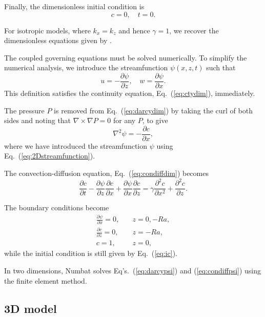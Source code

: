 \documentclass[11pt, a4paper]{csiroreport2012}
\begin{document}
Finally, the dimensionless initial condition is
\begin{equation}
c = 0, \quad t = 0.
\label{eq:ic}
\end{equation}

For isotropic models, where $k_x = k_z$ and hence $\gamma = 1$, we recover the dimensionless equations given by \cite{Slim2014}.

The coupled governing equations must be solved numerically. To simplify the numerical analysis, we introduce the streamfunction $\psi(x,z,t)$ such that
\begin{equation}
u = - \frac{\partial \psi}{\partial z}, \quad w = \frac{\partial \psi}{\partial x}.
\label{eq:2Dstreamfunction}
\end{equation}
This definition satisfies the continuity equation, Eq.~(\ref{eq:ctydim}), immediately. 

The pressure $P$ is removed from Eq.~(\ref{eq:darcydim}) by taking the curl of both sides and noting that $\nabla \times \nabla P = 0 $ for any $P$, to give
\begin{equation}
\nabla^2 \psi = - \frac{\partial c}{\partial x},
\label{eq:darcypsi}
\end{equation}
where we have introduced the streamfunction $\psi$ using Eq.~(\ref{eq:2Dstreamfunction}).

The convection-diffusion equation, Eq.~(\ref{eq:condiffdim}) becomes
\begin{equation}\frac{\partial c}{\partial t} - \frac{\partial \psi}{\partial z} \frac{\partial c}{\partial x} + \frac{\partial \psi}{\partial x} \frac{\partial c}{\partial z} = \gamma \frac{\partial^2 c}{\partial x^2} + \frac{\partial^2 c}{\partial z}.
\label{eq:condiffpsi}
\end{equation}

The boundary conditions become
\begin{align}
\frac{\partial \psi}{\partial x} = 0,&  \quad z = 0, -Ra, \\
\frac{\partial c}{\partial z} = 0,& \quad z = -Ra, \\
c = 1,& \quad z = 0,
\label{eq:bcpsi}
\end{align}
while the initial condition is still given by Eq.~(\ref{eq:ic}).

In two dimensions, Numbat solves Eq's.~(\ref{eq:darcypsi}) and (\ref{eq:condiffpsi}) using the finite element method.

\subsection{3D model}
\end{document}
